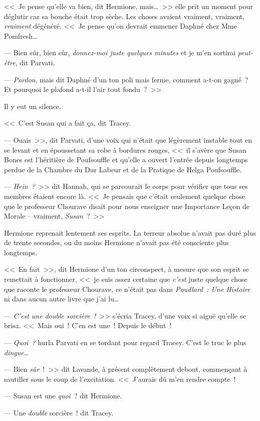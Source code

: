 <<~Je pense qu'elle va bien, dit Hermione, mais…~>> elle prit un moment pour déglutir car sa bouche était trop sèche. Les choses avaient vraiment, vraiment, \emph{vraiment} dégénéré. <<~Je pense qu'on devrait emmener Daphné chez Mme Pomfresh…

--- Bien sûr, bien sûr, \emph{donnez-moi juste quelques minutes} et je m'en sortirai \emph{peut-être}, dit Parvati.

--- \emph{Pardon}, mais dit Daphné d'un ton poli mais ferme, comment a-t-on gagné~? Et pourquoi le plafond a-t-il l'air tout fondu~?~>>

Il y eut un silence.

<<~C'est Susan qui a fait ça, dit Tracey.

--- Ouais~>>, dit Parvati, d'une voix qui n'était que légèrement instable tout en se levant et en époussetant sa robe à bordures rouges, <<~il s'avère que Susan Bones est l'héritière de Poufsouffle et qu'elle a ouvert l'entrée depuis longtemps perdue de la Chambre du Dur Labeur et de la Pratique de Helga Poufsouffle.

--- \emph{Hein~?}~>> dit Hannah, qui se parcourait le corps pour vérifier que tous ses membres étaient encore là. <<~Je pensais que c'était seulement quelque chose que le professeur Chourave disait pour nous enseigner une Importance Leçon de Morale -- vraiment, \emph{Susan}~?~>>

Hermione reprenait lentement ses esprits. La terreur absolue n'avait pas duré plus de trente secondes, ou du moins Hermione n'avait pas été consciente plus longtemps.

<<~En fait~>>, dit Hermione d'un ton circonspect, à mesure que son esprit se remettait à fonctionner, <<~je suis assez certaine que \emph{c'est} juste quelque chose que raconte le professeur Chourave, ce n'était pas dans \emph{Poudlard~: Une Histoire} ni dans aucun autre livre que j'ai lu…

--- \emph{C'est une double sorcière~!}~>> s'écria Tracey, d'une voix si aiguë qu'elle se brisa. <<~Mais oui~! C'en est une~! Depuis le début~!

--- \emph{Quoi~?} hurla Parvati en se tordant pour regard Tracey. C'est le truc le plus \emph{dingue}…

--- Bien \emph{sûr}~!~>> dit Lavande, à présent complètement debout, commençant à sautiller sous le coup de l'excitation. <<~J'aurais dû m'en rendre compte~!

--- Susan est une \emph{quoi}~? dit Hermione.

--- Une \emph{double} sorcière~! dit Tracey.

